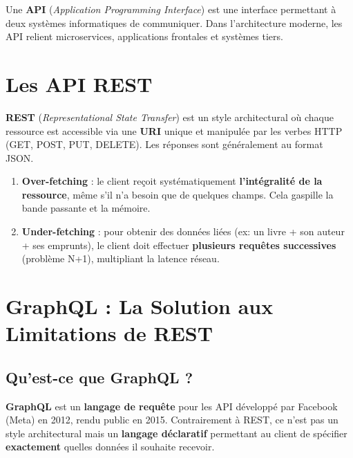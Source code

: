 \documentclass[12pt,a4paper]{article}
\begin{document}
Une \textbf{API} (\textit{Application Programming Interface}) est une interface permettant à deux systèmes informatiques de communiquer. Dans l'architecture moderne, les API relient microservices, applications frontales et systèmes tiers.

\section{Les API REST}

\textbf{REST} (\textit{Representational State Transfer}) est un style architectural où chaque ressource est accessible via une \textbf{URI} unique et manipulée par les verbes HTTP (GET, POST, PUT, DELETE). Les réponses sont généralement au format JSON.



\begin{warningbox}[title={Les deux failles structurelles de REST}]
\begin{enumerate}[leftmargin=1.5cm]
    \item \textbf{Over-fetching} : le client reçoit systématiquement \textbf{l'intégralité de la ressource}, même s'il n'a besoin que de quelques champs. Cela gaspille la bande passante et la mémoire.

    \item \textbf{Under-fetching} : pour obtenir des données liées (ex: un livre + son auteur + ses emprunts), le client doit effectuer \textbf{plusieurs requêtes successives} (problème N+1), multipliant la latence réseau.
\end{enumerate}
\end{warningbox}



\section{GraphQL : La Solution aux Limitations de REST}

\subsection{Qu'est-ce que GraphQL ?}

\textbf{GraphQL} est un \textbf{langage de requête} pour les API développé par Facebook (Meta) en 2012, rendu public en 2015. Contrairement à REST, ce n'est pas un style architectural mais un \textbf{langage déclaratif} permettant au client de spécifier \textbf{exactement} quelles données il souhaite recevoir.
\end{document}
